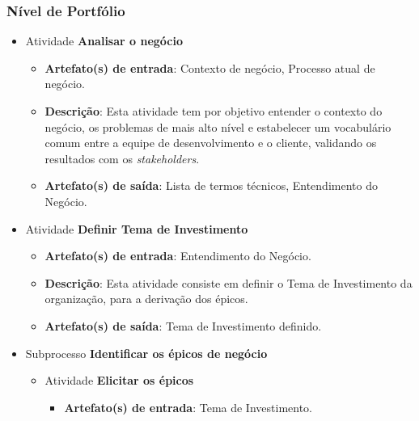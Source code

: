 
  \subsubsection{Nível de Portfólio}
    
    \begin{itemize}
      
      \item Atividade \textbf{Analisar o negócio}
	  
	  \begin{itemize}
	    \item \textbf{Artefato(s) de entrada}: Contexto de negócio, Processo atual de negócio.
	    
	    \item \textbf{Descrição}: Esta atividade tem por objetivo entender o contexto do negócio, os problemas de mais alto nível
	      e estabelecer um vocabulário comum entre a equipe de desenvolvimento e o cliente, validando os resultados com os
	      \textit{stakeholders}.
	    
	    \item \textbf{Artefato(s) de saída}: Lista de termos técnicos, Entendimento do Negócio.
	      
	  \end{itemize}
     
     \item Atividade \textbf{Definir Tema de Investimento}
	
	\begin{itemize}
	  \item \textbf{Artefato(s) de entrada}: Entendimento do Negócio.
	  
	  \item \textbf{Descrição}: Esta atividade consiste em definir o Tema de Investimento da organização,
	    para a derivação dos épicos.
	  
	  \item \textbf{Artefato(s) de saída}: Tema de Investimento definido.
	 	 
	\end{itemize}
	
     \item Subprocesso \textbf{Identificar os épicos de negócio}
	
	\begin{itemize}
	  
	  \item Atividade \textbf{Elicitar os épicos}
	  
	      \begin{itemize}
		\item \textbf{Artefato(s) de entrada}: Tema de Investimento.
		

\end{itemize}
\end{itemize}
\end{itemize}
